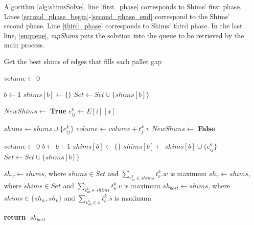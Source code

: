 \documentclass[preprint,authoryear]{elsarticle}
\renewcommand{\Return}{\State \bf {return}~}
\begin{document}
Algorithm \ref{alg:shimsSolve}, line \ref{first_phase} corresponds to Shims' first phase. Lines  \ref{second_phase_begin}-\ref{second_phase_end} correspond to the Shims' second phase.
Line \ref{third_phase} corresponds to Shims' third phase. In the last line, \ref{enqueue}, {\it mpShims} puts the solution into the queue to be retrieved by the main process.


\begin{algorithm}[H]
	\caption{Get the best shims of edges that fills each pallet gap}  \label{alg:getBestShims}
	\begin{algorithmic}[1]
		
		
		\State $volume \gets 0$	
		
		\State $b \gets 1$
		\State $shims[b] \gets \{\}$  \label{empty_shims}
		\State $Set \gets Set \cup \{shims[b]\}$ \label{empty_set}
		
		 \label{edges_indexes}
				

			\State $NewShims \gets$ {\bf True} \label{new_shims}
			\State $e_{ij}^k \gets E[i][x]$
			
			 \label{shims_set}
							
				
					
					\State $shims \gets shims \cup \{e_{ij}^k\}$
					\State $volume \gets volume + t_j^k.v$
					\State $NewShims \gets$ {\bf False} \label{new_shims_false}
		
		
				\EndIf
			
			\EndFor 
		
			 \label{new_shims2}
				\State $volume \gets 0$
				\State $b \gets b + 1$
				\State $shims[b] \gets \{\}$
				\State $shims[b] \gets shims[b] \cup \{e_{ij}^k\}$
				\State $Set \gets Set \cup \{shims[b]\}$
			\EndIf

		\EndFor 
		
		\State $sh_w \gets shims$, where $shims \in Set$ and $\sum_{e_{ab}^k \in shims} t_b^k.w$ is maximum  \label{best_weight}		
		\State $sh_v \gets shims$, where $shims \in Set$ and $\sum_{e_{ab}^k \in shims} t_b^k.v$ is maximum \label{best_volume}
		\State $sh_{best} \gets shims$, where $shims \in \{sh_w, sh_v\}$ and $\sum_{e_{ab}^k \in x} t_b^k.s$ is maximum \label{best_score}
		
		\Return $sh_{best}$
		
		\EndProcedure
		
	\end{algorithmic}
\end{algorithm}
\end{document}
